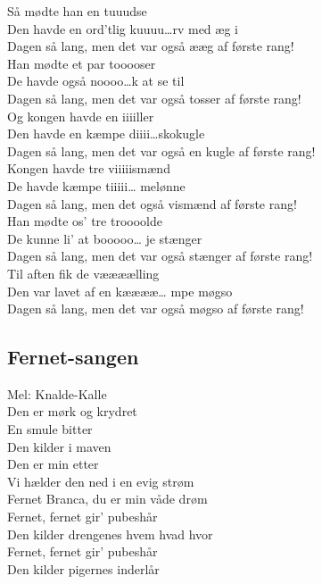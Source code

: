 Så mødte han en tuuudse\\
Den havde en ord’tlig kuuuu…rv med æg i\\
Dagen så lang, men det var også ææg af første rang!\\

Han mødte et par tooooser\\
De havde også noooo…k at se til\\
Dagen så lang, men det var også tosser af første rang!\\

Og kongen havde en iiiiller\\
Den havde en kæmpe diiii…skokugle\\
Dagen så lang, men det var også en kugle af første rang!\\

Kongen havde tre viiiiismænd\\
De havde kæmpe tiiiii… melønne\\ 
Dagen så lang, men det også vismænd af første rang!\\

Han mødte os’ tre troooolde\\
De kunne li’ at booooo… je stænger\\ 
Dagen så lang, men det var også stænger af første rang!\\

Til aften fik de væææælling\\
Den var lavet af en kææææ… mpe møgso\\ 
Dagen så lang, men det var også møgso af første rang!\\

\subsection*{Fernet-sangen}

Mel: Knalde-Kalle\\

Den er mørk og krydret\\
En smule bitter\\
Den kilder i maven\\
Den er min etter\\
Vi hælder den ned i en evig strøm\\
Fernet Branca, du er min våde drøm\\

Fernet, fernet gir’ pubeshår\\
Den kilder drengenes hvem hvad hvor\\
Fernet, fernet gir’ pubeshår\\
Den kilder pigernes inderlår\\

